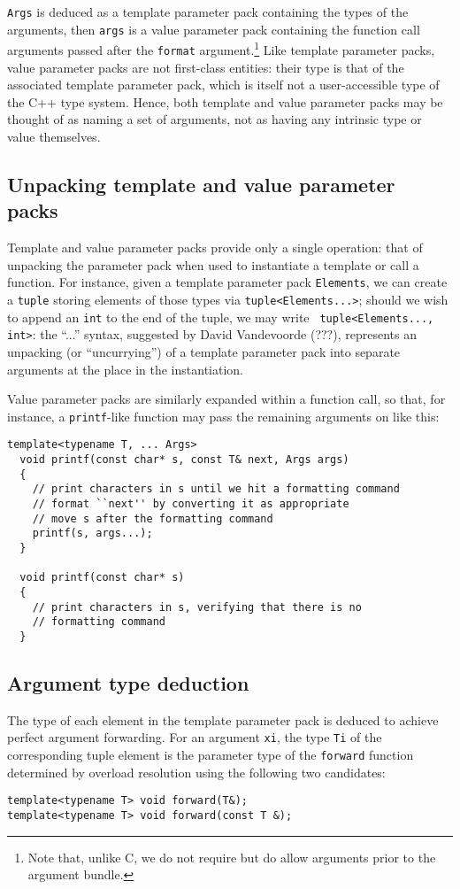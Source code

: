 \documentclass{article}
\begin{document}
{\tt Args} is deduced as a template parameter pack containing the types of
the arguments, then {\tt args} is a value parameter pack containing
the function call arguments passed after the {\tt format}
argument.\footnote{Note that, unlike C, we do not require but
  do allow arguments prior to the argument bundle.} Like template
parameter packs, value parameter packs are not first-class entities:
their type is that of the associated template parameter pack, which is
itself not a user-accessible type of the C++ type system. 
Hence, both template and value
parameter packs may be thought of as naming a set of arguments, not as
having any intrinsic type or value themselves.

\subsection{Unpacking template and value parameter packs}
Template and value parameter packs provide only a single operation:
that of unpacking the parameter pack when used to instantiate a
template or call a function. For instance, given a template parameter
pack {\tt Elements}, we can create a {\tt tuple} storing elements of
those types via {\tt tuple<Elements...>}; should we wish to append an
{\tt int} to the end of the tuple, we may write {\tt
  tuple<Elements..., int>}: the ``...'' syntax, suggested
by David Vandevoorde (???), represents an unpacking (or
``uncurrying'') of a template parameter pack into separate
arguments at the place in the instantiation.

Value parameter packs are similarly expanded within a function call,
so that, for instance, a {\tt printf}-like function may pass the
remaining arguments on like this:
\begin{verbatim}
template<typename T, ... Args>
  void printf(const char* s, const T& next, Args args)
  {
    // print characters in s until we hit a formatting command
    // format ``next'' by converting it as appropriate
    // move s after the formatting command
    printf(s, args...);
  }

  void printf(const char* s)
  {
    // print characters in s, verifying that there is no 
    // formatting command
  }
\end{verbatim}

\subsection{Argument type deduction}
The type of each element in the template parameter pack is deduced to
achieve perfect argument forwarding. For an argument {\tt xi}, the
type {\tt Ti} of the corresponding tuple element is the parameter type
of the {\tt forward} function determined by overload resolution using
the following two candidates:
\begin{verbatim}
template<typename T> void forward(T&);
template<typename T> void forward(const T &);
\end{verbatim}
\end{document}

